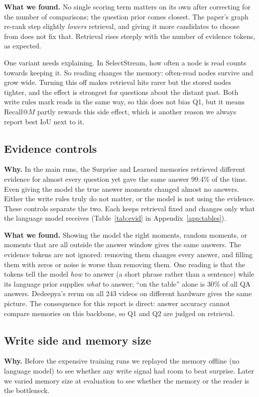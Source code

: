 \documentclass[11pt,a4paper]{article}
\begin{document}
\textbf{What we found.} No single scoring term matters on its own after correcting for the number of comparisons; the
question prior comes closest. The paper's graph re-rank step slightly \emph{lowers} retrieval, and giving it more
candidates to choose from does not fix that. Retrieval rises steeply with the number of evidence tokens, as expected.

One variant needs explaining. In SelectStream, how often a node is read counts towards keeping it. So reading changes the
memory: often-read nodes survive and grow wide. Turning this off makes retrieval hits rarer but the stored nodes tighter, and
the effect is strongest for questions about the distant past. Both write rules mark reads in the same way, so this does not
bias Q1, but it means Recall@$M$ partly rewards this side effect, which is another reason we always report best IoU next to it.

\subsection{Evidence controls}\label{sec:evid}
\textbf{Why.} In the main runs, the Surprise and Learned memories retrieved different evidence for almost every question
yet gave the same answer 99.4\% of the time. Even giving the model the true answer moments changed almost no answers. Either
the write rules truly do not matter, or the model is not using the evidence. These controls separate the two. Each keeps
retrieval fixed and changes only what the language model receives (Table~\ref{tab:evid} in Appendix~\ref{app:tables}).

\textbf{What we found.} Showing the model the right moments, random moments, or moments that are all outside the answer
window gives the same answers. The evidence tokens are not ignored: removing them changes every answer, and filling them with
zeros or noise is worse than removing them. One reading is that the tokens tell the model \emph{how} to answer (a short
phrase rather than a sentence) while its language prior supplies \emph{what} to answer; ``on the table'' alone is 30\% of
all QA answers. Dedeepya's rerun on all 243 videos on different hardware gives the same picture. The consequence for this
report is direct: answer accuracy cannot compare memories on this backbone, so Q1 and Q2 are judged on retrieval.

\subsection{Write side and memory size}\label{sec:write}
\textbf{Why.} Before the expensive training runs we replayed the memory offline (no language model) to see whether any write
signal had room to beat surprise. Later we varied memory size at evaluation to see whether the memory or the reader is the
bottleneck.
\end{document}
